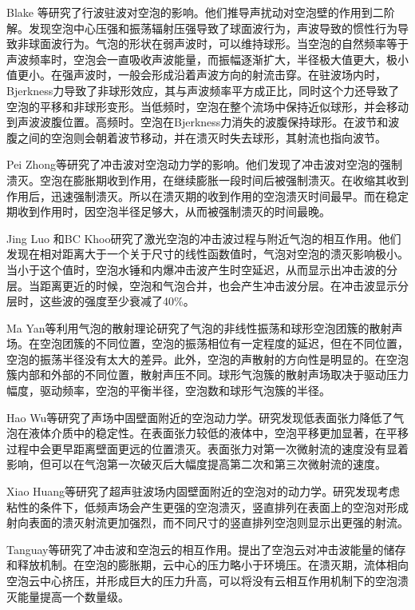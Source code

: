 Blake 等研究了行波驻波对空泡的影响\cite{wang_non-spherical_2010,wang_non-spherical_2011}。他们推导声扰动对空泡壁的作用到二阶解。发现空泡中心压强和振荡辐射压强导致了球面波行为，声波导致的惯性行为导致非球面波行为。气泡的形状在弱声波时，可以维持球形。当空泡的自然频率等于声波频率时，空泡会一直吸收声波能量，而振幅逐渐扩大，半径极大值更大，极小值更小。在强声波时，一般会形成沿着声波方向的射流击穿。在驻波场内时，Bjerkness力导致了非球形效应，其与声波频率平方成正比，同时这个力还导致了空泡的平移和非球形变形。当低频时，空泡在整个流场中保持近似球形，并会移动到声波波腹位置。高频时。空泡在Bjerkness力消失的波腹保持球形。在波节和波腹之间的空泡则会朝着波节移动，并在溃灭时失去球形，其射流也指向波节。

Pei Zhong等研究了冲击波对空泡动力学的影响\cite{klaseboer_interaction_2007, sankin_shock_2005}。他们发现了冲击波对空泡的强制溃灭。空泡在膨胀期收到作用，在继续膨胀一段时间后被强制溃灭。在收缩其收到作用后，迅速强制溃灭。所以在溃灭期的收到作用的空泡溃灭时间最早。而在稳定期收到作用时，因空泡半径足够大，从而被强制溃灭的时间最晚。

Jing Luo 和BC Khoo研究了激光空泡的冲击波过程与附近气泡的相互作用\cite{luo_stratification_2021}。他们发现在相对距离大于一个关于尺寸的线性函数值时，气泡对空泡的溃灭影响极小。当小于这个值时，空泡水锤和内爆冲击波产生时空延迟，从而显示出冲击波的分层。当距离更近的时候，空泡和气泡合并，也会产生冲击波分层。在冲击波显示分层时，这些波的强度至少衰减了40\%。

Ma Yan等\cite{ma_nonlinear_2021}利用气泡的散射理论研究了气泡的非线性振荡和球形空泡团簇的散射声场。在空泡团簇的不同位置，空泡的振荡相位有一定程度的延迟，但在不同位置，空泡的振荡半径没有太大的差异。此外，空泡的声散射的方向性是明显的。在空泡簇内部和外部的不同位置，散射声压不同。球形气泡簇的散射声场取决于驱动压力幅度，驱动频率，空泡的平衡半径，空泡数和球形气泡簇的半径。

Hao Wu等研究了声场中固壁面附近的空泡动力学\cite{wu_effects_2021,wu_experimental_2020}。研究发现低表面张力降低了气泡在液体介质中的稳定性。在表面张力较低的液体中，空泡平移更加显著，在平移过程中会更早距离壁面更远的位置溃灭。表面张力对第一次微射流的速度没有显着影响，但可以在气泡第一次破灭后大幅度提高第二次和第三次微射流的速度。

Xiao Huang等研究了超声驻波场内固壁面附近的空泡对的动力学\cite{huang_nonlinear_2020}。研究发现考虑粘性的条件下，低频声场会产生更强的空泡溃灭，竖直排列在表面上的空泡对形成射向表面的溃灭射流更加强烈，而不同尺寸的竖直排列空泡则显示出更强的射流。

Tanguay等研究了冲击波和空泡云的相互作用\cite{tanguay_computation_2004}。提出了空泡云对冲击波能量的储存和释放机制。在空泡的膨胀期，云中心的压力略小于环境压。在溃灭期，流体相向空泡云中心挤压，并形成巨大的压力升高，可以将没有云相互作用机制下的空泡溃灭能量提高一个数量级。
\bigskip
